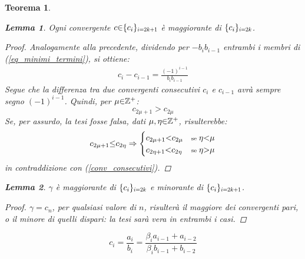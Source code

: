 \documentclass[twoside,symmetric,justified,openany,nobib]{tufte-book}
\def\SP#1{\textsuperscript{#1}}
\newtheorem{thm}{Teorema}
\newtheorem{lem}{Lemma}
\begin{document}
\begin{thm}
{    \begin{lem}
      \label{lemma5}
      Ogni convergente $c{\in}\{ c_i \}_{\scalebox{0.7}{$i{=}2k{+}1$}}$ è maggiorante di $\{ c_i \}_{\scalebox{0.7}{$i{=}2k$}}$.
    \end{lem}
    \begin{proof}
      Analogamente alla precedente, dividendo per ${-}b_ib_{i{-}1}$ entrambi i membri di (\ref{eq_minimi_termini}), si ottiene:
      \[
        \begin{array}{c}
          c_i{-}c_{i-1} = \frac{({-}1)^{i-1}}{b_ib_{i-1}}
        \end{array}
      \]
      Segue che la differenza tra due convergenti consecutivi $c_i$ e $c_{i-1}$ avrà sempre segno $({-}1)^{i-1}$. Quindi, per $\mu{\in}\mathbb{Z}\SP{+}$:
      \begin{equation}
        \label{conv_consecutivi}
        c_{2\mu+1} > c_{2\mu}
      \end{equation}
      Se, per assurdo, la tesi fosse falsa, dati $\mu,\eta{\in}\mathbb{Z}\SP{+}$, risulterebbe:
      \[
        c_{2\mu+1}{\leq}c_{2\eta} \Rightarrow
        \begin{cases}
          c_{2\mu+1}{<}c_{2\mu} &\text{\scriptsize se } \eta{<}\mu\\
          c_{2\eta+1}{<}c_{2\eta} &\text{\scriptsize se } \eta{>}\mu
        \end{cases}
      \]
      in contraddizione con (\ref{conv_consecutivi}).
    \end{proof}
  
    \begin{lem}
      \label{lemma6}
      $\gamma$ è maggiorante di $\{ c_i \}_{\scalebox{0.7}{$i{=}2k$}}$ e minorante di $\{ c_i \}_{\scalebox{0.7}{$i{=}2k{+}1$}}$.
    \end{lem}
    \begin{proof}
      $\gamma{=}c_n$, per qualsiasi valore di $n$, risulterà il maggiore dei convergenti pari, o il minore di quelli dispari: la tesi sarà vera in entrambi i casi.
    \end{proof}
  }
  \begin{equation}
    \label{eq_convergente}
    c_i = \frac{a_i}{b_i} = \frac{\beta_i a_{i-1}{+}a_{i-2}}{\beta_i b_{i-1}{+}b_{i-2}}
  \end{equation}
\end{thm}
\end{document}
